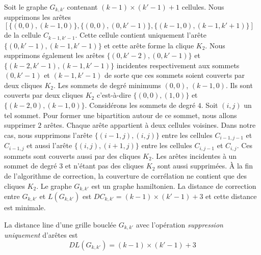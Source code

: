\label{modificationSuppressionAretesUniquement}
Soit le graphe $G_{k,k'}$ contenant $(k-1) \times (k'-1) + 1$ cellules.
Nous supprimons les ar\^etes \\ $[\{(0,0),(k-1,0) \},  \{(0,0),(0, k'-1) \}, \{(k-1,0),(k-1,k'+1) \}]$ de la  cellule $C_{k-1,k'-1}$. Cette cellule contient uniquement  l'ar\^ete $\{(0,k'-1),(k-1,k'-1) \}$ et cette ar\^ete forme la clique $K_2$.
Nous supprimons \'egalement les ar\^etes $\{(0,k'-2),(0,k'-1)\}$ et $\{(k-2,k'-1),(k-1,k'-1) \}$  incidentes respectivement aux sommets $(0,k'-1)$ et $(k-1,k'-1)$ de sorte que ces sommets soient couverts par deux cliques $K_2$.
Les sommets de degr\'e minimums $(0,0)$, $(k-1,0)$. Ils sont couverts par deux cliques $K_2$ c'est-\`a-dire $\{(0,0),(1,0)\}$ et $\{(k-2,0) ,(k-1,0)\}$.
\newline
Consid\'erons les sommets de degr\'e $4$. Soit $(i,j)$ un tel sommet.
Pour former une bipartition autour de ce sommet, nous allons supprimer $2$ ar\^etes. Chaque ar\^ete appartient \`a deux cellules voisines. Dans notre cas, nous supprimons l'ar\^ete $\{(i-1, j), (i,j)\}$ entre les cellules $C_{i-1,j-1}$ et $C_{i-1,j}$ et aussi l'ar\^ete $\{(i,j), (i+1,j)\}$ entre les cellules $C_{i,j-1}$ et $C_{i,j}$. Ces sommets sont couverts aussi par des cliques $K_2$.
\newline
Les ar\^etes incidentes \`a un sommet de degr\'e $3$ et n'\'etant pas des cliques $K_2$ sont aussi supprim\'ees.
\newline
\`A la fin de l'algorithme de correction, la couverture de corr\'elation ne contient que des cliques $K_2$.
Le graphe $G_{k,k'}$ est un graphe hamiltonien.
La distance de correction entre $G_{k,k'}$ et $L(G_{k,k'})$ est 
$DC_{k,k'} = (k-1) \times (k'-1) +3 $ 
et cette distance est minimale.

\begin{lemma}
La distance line  d'une grille boucl\'ee $G_{k,k'}$ avec l'op\'eration {\em suppression uniquement} d'ar\^etes est 
\begin{equation}
\label{borneSuperieureDL}
DL(G_{k,k'}) = (k-1) \times (k'-1) +3 
\end{equation}
\end{lemma}

